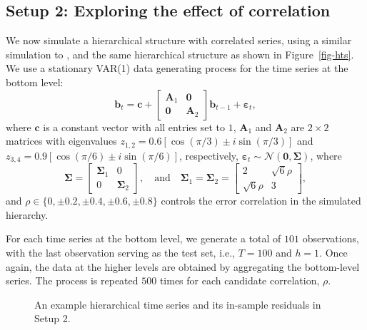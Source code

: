 \documentclass[
  11pt]{article}
\theoremstyle{plain}
\theoremstyle{remark}
\begin{document}
\subsection{Setup 2: Exploring the effect of
correlation}\label{sec-sim2}

We now simulate a hierarchical structure with correlated series, using a
similar simulation to \citet{Wickramasuriya2021-am}, and the same
hierarchical structure as shown in Figure~\ref{fig-hts}. We use a
stationary VAR(1) data generating process for the time series at the
bottom level: \[
\bm{b}_t= \bm{c} + \left[\begin{array}{cc}
\bm{A}_1 & \bm{0} \\
\bm{0} & \bm{A}_2
\end{array}\right] \bm{b}_{t-1} + \bm{\varepsilon}_t,
\] where \(\bm{c}\) is a constant vector with all entries set to \(1\),
\(\bm{A}_1\) and \(\bm{A}_2\) are \(2 \times 2\) matrices with
eigenvalues \(z_{1,2}=0.6[\cos (\pi / 3) \pm i \sin (\pi / 3)]\) and
\(z_{3,4}=0.9[\cos (\pi / 6) \pm i \sin (\pi / 6)]\), respectively,
\(\bm{\varepsilon}_t \sim \mathcal{N}(\bm{0}, \bm{\Sigma})\), where \[
\bm{\Sigma}=\left[\begin{array}{cc}
\bm{\Sigma}_1 & 0 \\0 & \bm{\Sigma}_2
\end{array}\right], \quad\text{and}\quad \bm{\Sigma}_1=\bm{\Sigma}_2=\left[\begin{array}{cc}2 & \sqrt{6} \rho \\\sqrt{6} \rho & 3\end{array}\right],
\] and \(\rho \in \{0, \pm 0.2, \pm 0.4, \pm 0.6, \pm 0.8\}\) controls
the error correlation in the simulated hierarchy.

For each time series at the bottom level, we generate a total of \(101\)
observations, with the last observation serving as the test set, i.e.,
\(T=100\) and \(h=1\). Once again, the data at the higher levels are
obtained by aggregating the bottom-level series. The process is repeated
\(500\) times for each candidate correlation, \(\rho\).

\begin{figure}[!b]


\caption{\label{fig-corr-data}An example hierarchical time series and
its in-sample residuals in Setup 2.}

\end{figure}%
\end{document}
